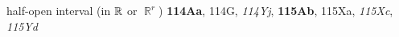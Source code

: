 \indexmedskip









































half-open interval (in $\Bbb R$ or $\BbbR^r$) {\bf 114Aa}, 114G,
{\it 114Yj}, {\bf 115Ab}, 115Xa, {\it 115Xc}, {\it 115Yd}


















































































